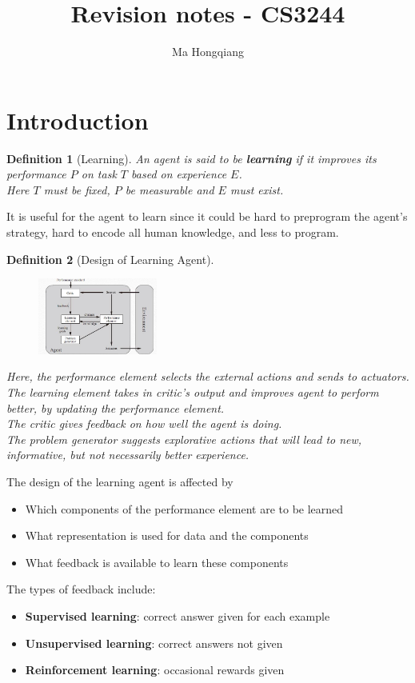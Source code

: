 \documentclass[12pt]{article}
\newtheorem{definition}{Definition}[section]
\theoremstyle{definition}
\begin{document}
\title{Revision notes - CS3244}
\author{Ma Hongqiang}
\maketitle
\tableofcontents

\twocolumn
\section{Introduction}
\begin{definition}[Learning]
\normalfont
An agent is said to be \textbf{learning} if it improves its performance $P$ on task $T$ based on experience $E$.\\
Here $T$ must be fixed, $P$ be measurable and $E$ must exist.
\end{definition}
It is useful for the agent to learn since it could be hard to preprogram the agent's strategy, hard to encode all human knowledge, and less to program.
\begin{definition}[Design of Learning Agent]
\normalfont \begin{figure}[h]
\centering
\includegraphics[width=0.35\textwidth]{1-1.jpg}
\end{figure}
Here, the performance element selects the external actions and sends to actuators.\\
The learning element takes in critic's output and improves agent to perform better, by updating the performance element.\\
The critic gives feedback on how well the agent is doing.\\
The problem generator suggests explorative actions that will lead to new, informative, but not necessarily better experience.
\end{definition}
The design of the learning agent is affected by
\begin{itemize}
	\item Which components of the performance element are to be learned
	\item What representation is used for data and the components
	\item What feedback is available to learn these components
\end{itemize}
The types of feedback include:
\begin{itemize}
	\item \textbf{Supervised learning}: correct answer given for each example
	\item \textbf{Unsupervised learning}: correct answers not given
	\item \textbf{Reinforcement learning}: occasional rewards given
\end{itemize}
\end{document}
